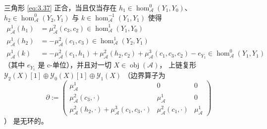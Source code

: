 \begin{Lem}\label{lem:3.20}
三角形 \eqref{eq:3.37} 正合，当且仅当存在 $h_1\in\hom^0_{\mathcal A}(Y_1,Y_0)$、
$h_2\in\hom^0_{\mathcal A}(Y_2,Y_1)$ 与 $k\in\hom^{-1}_{\mathcal A}(Y_1,Y_1)$
使得
\begin{equation}\label{eq:3.39}
  \begin{aligned}
    \mu^1_{\mathcal A}(h_1)&=\mu^2_{\mathcal A}(c_3,c_2)
    \in\hom^1_{\mathcal A}(Y_1,Y_0)\\
    \mu^1_{\mathcal A}(h_2)&=-\mu^2_{\mathcal A}(c_1,c_3)
    \in\hom^1_{\mathcal A}(Y_2,Y_1)\\
    \mu^1_{\mathcal A}(k)&=-\mu^2_{\mathcal A}(c_1,h_1)+
    \mu^2_{\mathcal A}(h_2,c_2)+\mu^3_{\mathcal A}(c_1,c_3,c_2)-e_{Y_1}
    \in\hom^0_{\mathcal A}(Y_1,Y_1)
  \end{aligned}
\end{equation}
（其中 $e_{Y_1}$ 是 c-单位），并且对一切 $X\in\operatorname{obj}(\mathcal A)$，
上链复形 $\mathcal Y_2(X)[1]\oplus\mathcal Y_0(X)[1]\oplus\mathcal Y_1(X)$
（边界算子为
\[
  \partial:=
  \begin{pmatrix}
    \mu^1_{\mathcal A} & 0 & 0\\
    \mu^2_{\mathcal A}(c_3,\cdot) & \mu^1_{\mathcal A} & 0\\
    \mu^2_{\mathcal A}(h_2,\cdot)+\mu^3_{\mathcal A}(c_1,c_3,\cdot)
    & \mu^2_{\mathcal A}(c_1,\cdot) & \mu^1_{\mathcal A}
  \end{pmatrix}
\]）
是无环的。
\end{Lem}

